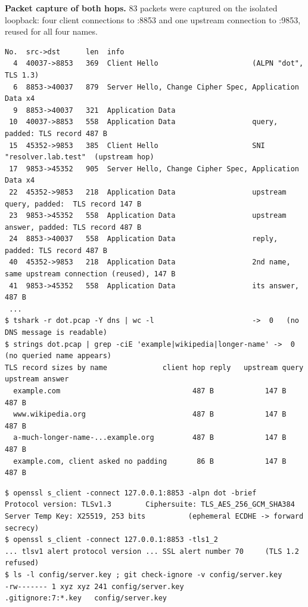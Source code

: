 \documentclass[11pt,a4paper]{article}
\newcommand{\code}[1]{\texttt{#1}}
\begin{document}
\textbf{Packet capture of both hops.} 83 packets were captured on the isolated loopback: four client
connections to :8853 and one upstream connection to :9853, reused for all four names.
\begin{lstlisting}[caption={\code{tshark} on the capture: what an on-path observer sees},label={lst:pcap}]
No.  src->dst      len  info
  4  40037->8853   369  Client Hello                      (ALPN "dot", TLS 1.3)
  6  8853->40037   879  Server Hello, Change Cipher Spec, Application Data x4
  9  8853->40037   321  Application Data
 10  40037->8853   558  Application Data                  query, padded: TLS record 487 B
 15  45352->9853   385  Client Hello                      SNI "resolver.lab.test"  (upstream hop)
 17  9853->45352   905  Server Hello, Change Cipher Spec, Application Data x4
 22  45352->9853   218  Application Data                  upstream query, padded:  TLS record 147 B
 23  9853->45352   558  Application Data                  upstream answer, padded: TLS record 487 B
 24  8853->40037   558  Application Data                  reply, padded: TLS record 487 B
 40  45352->9853   218  Application Data                  2nd name, same upstream connection (reused), 147 B
 41  9853->45352   558  Application Data                  its answer, 487 B
 ...
$ tshark -r dot.pcap -Y dns | wc -l                       ->  0   (no DNS message is readable)
$ strings dot.pcap | grep -ciE 'example|wikipedia|longer-name' ->  0   (no queried name appears)
TLS record sizes by name             client hop reply   upstream query   upstream answer
  example.com                               487 B            147 B             487 B
  www.wikipedia.org                         487 B            147 B             487 B
  a-much-longer-name-...example.org         487 B            147 B             487 B
  example.com, client asked no padding       86 B            147 B             487 B
\end{lstlisting}

\begin{lstlisting}[caption={Client-facing TLS parameters and the server key's protection}]
$ openssl s_client -connect 127.0.0.1:8853 -alpn dot -brief
Protocol version: TLSv1.3        Ciphersuite: TLS_AES_256_GCM_SHA384
Server Temp Key: X25519, 253 bits          (ephemeral ECDHE -> forward secrecy)
$ openssl s_client -connect 127.0.0.1:8853 -tls1_2
... tlsv1 alert protocol version ... SSL alert number 70     (TLS 1.2 refused)
$ ls -l config/server.key ; git check-ignore -v config/server.key
-rw------- 1 xyz xyz 241 config/server.key
.gitignore:7:*.key   config/server.key
\end{lstlisting}
\end{document}
